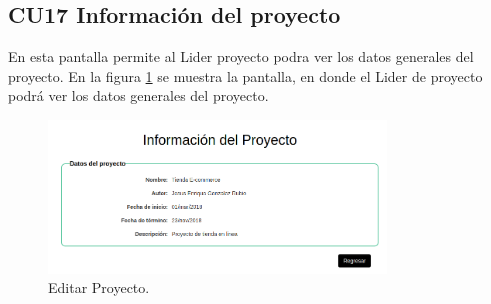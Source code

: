 \subsection{CU17 Información del proyecto}
{
\justify
{}
}

\justify
En esta pantalla permite al Lider proyecto podra ver los datos generales del proyecto.
{
\justify
{}
}
\justify
En la figura \ref{fig:IU17} se muestra la pantalla, en donde el Lider de proyecto podrá ver los datos generales del proyecto.

\begin{figure}[htb]
\centering
\includegraphics[width=0.8\textwidth]{./images/cu17-informacion-proyecto.png}
\caption{Editar Proyecto.} \label{fig:IU17}
\end{figure}